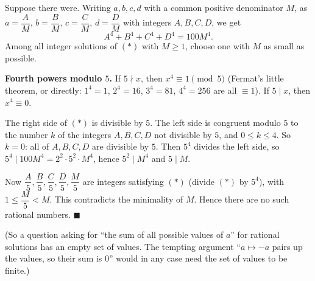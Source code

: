 Suppose there were. Writing $a,b,c,d$ with a common positive denominator $M$, as $a=\dfrac AM$, $b=\dfrac BM$, $c=\dfrac CM$, $d=\dfrac DM$ with integers $A,B,C,D$, we get
\[A^4+B^4+C^4+D^4=100M^4.\tag{$*$}\]
Among all integer solutions of $(*)$ with $M\ge1$, choose one with $M$ as small as possible.

\textbf{Fourth powers modulo $5$.} If $5\nmid x$, then $x^4\equiv1\pmod5$ (Fermat's little theorem, or directly: $1^4=1$, $2^4=16$, $3^4=81$, $4^4=256$ are all $\equiv1$). If $5\mid x$, then $x^4\equiv0$.

The right side of $(*)$ is divisible by $5$. The left side is congruent modulo $5$ to the number $k$ of the integers $A,B,C,D$ not divisible by $5$, and $0\le k\le4$. So $k=0$: all of $A,B,C,D$ are divisible by $5$. Then $5^4$ divides the left side, so $5^4\mid100M^4=2^2\cdot5^2\cdot M^4$, hence $5^2\mid M^4$ and $5\mid M$.

Now $\dfrac A5,\dfrac B5,\dfrac C5,\dfrac D5,\dfrac M5$ are integers satisfying $(*)$ (divide $(*)$ by $5^4$), with $1\le\dfrac M5<M$. This contradicts the minimality of $M$. Hence there are no such rational numbers. $\blacksquare$

(So a question asking for ``the sum of all possible values of $a$'' for rational solutions has an empty set of values. The tempting argument ``$a\mapsto-a$ pairs up the values, so their sum is $0$'' would in any case need the set of values to be finite.)
